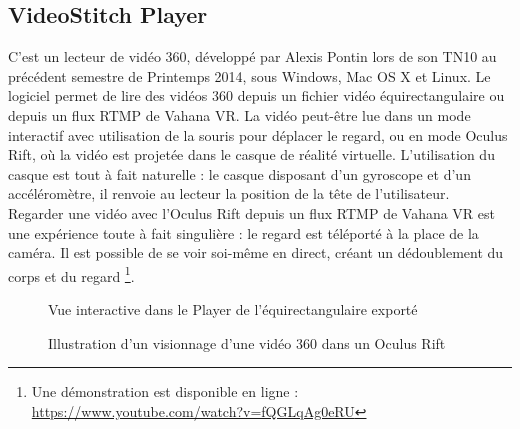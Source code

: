 \subsection{VideoStitch Player}
\label{videostitch-player-section}
C'est un lecteur de vidéo 360, développé par Alexis Pontin lors de son TN10 au précédent
semestre de Printemps 2014, sous Windows, Mac OS X et Linux. Le logiciel permet de lire des vidéos 360 depuis un 
fichier vidéo équirectangulaire ou depuis un flux RTMP de Vahana VR. La vidéo peut-être
lue dans un mode interactif avec utilisation de la souris pour déplacer le regard,
ou en mode Oculus Rift, où la vidéo est projetée dans le casque de réalité virtuelle.
L'utilisation du casque est tout à fait naturelle : le casque disposant d'un gyroscope
et d'un accéléromètre, il renvoie au lecteur la position de la tête de l'utilisateur.\\
Regarder une vidéo avec l'Oculus Rift depuis un flux RTMP de Vahana VR est une 
expérience toute à fait singulière : le regard est téléporté à la place de la caméra.
Il est possible de se voir soi-même en direct, créant un dédoublement du corps et du regard
\footnote{Une démonstration est disponible en ligne : \url{https://www.youtube.com/watch?v=fQGLqAg0eRU}}.
\begin{figure}
  \centering
  \begin{minipage}{0.45\textwidth}
     \centering
     \caption{Vue interactive dans le Player de l'équirectangulaire exporté}
  \end{minipage}%
  \hspace{0.08\textwidth}
  \begin{minipage}{0.45\textwidth}
    \centering
    \caption{Illustration d'un visionnage d'une vidéo 360 dans un Oculus Rift}
  \end{minipage}
\end{figure}

